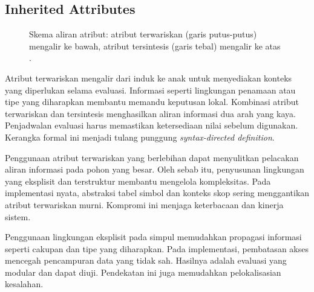 \documentclass[../main.tex]{subfiles}
\begin{document}
\subsection{Inherited Attributes}
\begin{figure}[t]
  \centering
  \caption{Skema aliran atribut: atribut terwariskan (garis putus-putus) mengalir ke bawah, atribut tersintesis (garis tebal) mengalir ke atas \citep{WikiAttributeGrammar,WikiSDT}.}
  \label{fig:attr-flow}
\end{figure}
Atribut terwariskan mengalir dari induk ke anak untuk menyediakan konteks yang diperlukan selama evaluasi. Informasi seperti lingkungan penamaan atau tipe yang diharapkan membantu memandu keputusan lokal. Kombinasi atribut terwariskan dan tersintesis menghasilkan aliran informasi dua arah yang kaya. Penjadwalan evaluasi harus memastikan ketersediaan nilai sebelum digunakan. Kerangka formal ini menjadi tulang punggung \emph{syntax-directed definition}.

Penggunaan atribut terwariskan yang berlebihan dapat menyulitkan pelacakan aliran informasi pada pohon yang besar. Oleh sebab itu, penyusunan lingkungan yang eksplisit dan terstruktur membantu mengelola kompleksitas. Pada implementasi nyata, abstraksi tabel simbol dan konteks skop sering menggantikan atribut terwariskan murni. Kompromi ini menjaga keterbacaan dan kinerja sistem.

Penggunaan lingkungan eksplisit pada simpul memudahkan propagasi informasi seperti cakupan dan tipe yang diharapkan. Pada implementasi, pembatasan akses mencegah pencampuran data yang tidak sah. Hasilnya adalah evaluasi yang modular dan dapat diuji. Pendekatan ini juga memudahkan pelokalisasian kesalahan.
\end{document}
